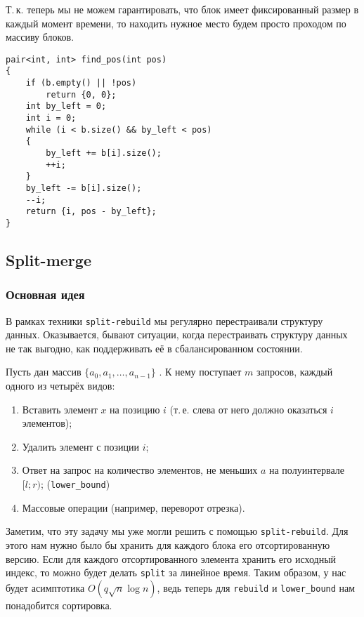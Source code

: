 Т.\,к. теперь мы не можем гарантировать, что блок имеет фиксированный размер в каждый момент времени, то находить нужное место будем просто проходом по массиву блоков.

\begin{verbatim}
pair<int, int> find_pos(int pos)
{
    if (b.empty() || !pos)
        return {0, 0};
    int by_left = 0;
    int i = 0;
    while (i < b.size() && by_left < pos)
    {
        by_left += b[i].size();
        ++i;
    }
    by_left -= b[i].size();
    --i;
    return {i, pos - by_left};
}
\end{verbatim}

\subsection{Split-merge}

\subsubsection{Основная идея}

В рамках техники \texttt{split-rebuild} мы регулярно перестраивали структуру данных. Оказывается, бывают ситуации, когда перестраивать структуру данных не так выгодно, как поддерживать её в сбалансированном состоянии.

\begin{problem}
    Пусть дан массив $\{a_0, a_1, \ldots, a_{n - 1}\}$ . К нему поступает $m$ запросов, каждый одного из четырёх видов:

    \begin{enumerate}[nolistsep]
        \item Вставить элемент $x$ на позицию $i$ (т.\,е. слева от него должно оказаться $i$ элементов);
        \item Удалить элемент с позиции $i$;
        \item Ответ на запрос на количество элементов, не меньших $a$ на полуинтервале $[l; r)$; (\texttt{lower\_bound})
        \item Массовые операции (например, переворот отрезка).
    \end{enumerate}
\end{problem}

Заметим, что эту задачу мы уже могли решить с помощью \texttt{split-rebuild}. Для этого нам нужно было бы хранить для каждого блока его отсортированную версию. Если для каждого отсортированного элемента хранить его исходный индекс, то можно будет делать \texttt{split} за линейное время. Таким образом, у нас будет асимптотика $O(q\sqrt{n}\log n)$, ведь теперь для \texttt{rebuild} и \texttt{lower\_bound} нам понадобится сортировка.

